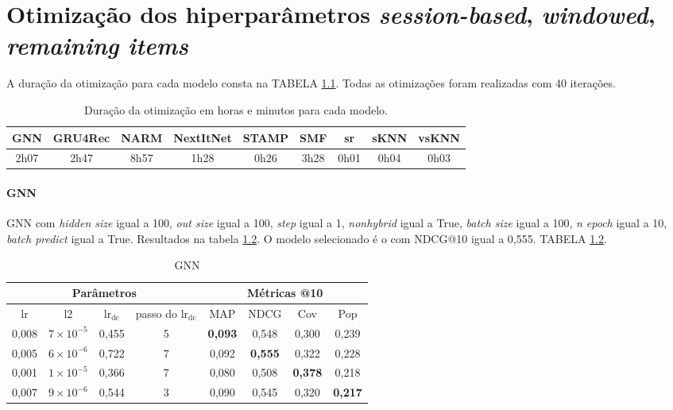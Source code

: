 \chapter{Otimização dos hiperparâmetros \textit{session-based}, \textit{windowed}, \textit{remaining items}}
A duração da otimização para cada modelo consta na TABELA
\ref{tab:duration_opt_remaining}. Todas as otimizações foram realizadas com
40 iterações.

\begin{table}[htbp]
  \centering
  \begin{tabular}{|c|c|c|c|c|c|c|c|c|}
      \hline
      GNN & GRU4Rec & NARM & NextItNet & STAMP & SMF & sr & sKNN & vsKNN \\
      \hline
      2h07 & 2h47 & 8h57 & 1h28 & 0h26 & 3h28 & 0h01 & 0h04 & 0h03 \\
      \hline
      \end{tabular}
      \caption{Duração da otimização em horas e minutos para cada modelo.}
      \label{tab:duration_opt_remaining}
\end{table}

\subsubsection{GNN}
GNN com \textit{hidden size} igual a 100, \textit{out size} igual a 100,
\textit{step} igual a 1, \textit{nonhybrid} igual a True, \textit{batch size}
igual a 100, \textit{n epoch} igual a 10, \textit{batch predict} igual a True.
Resultados na tabela \ref{opt:GNN_rem}. O modelo selecionado é o com NDCG@10
igual a 0,555. TABELA \ref{opt:GNN_rem}.

\begin{table}[htbp]
  \centering
  \begin{tabular}{|c|c|c|c|c|c|c|c|}
    \hline
      \multicolumn{4}{|c|}{Parâmetros} & \multicolumn{4}{c|}{Métricas @10} \\
      \hline
      lr & l2 & $\text{lr}_\text{dc}$ &passo do $\text{lr}_\text{dc}$ & MAP & NDCG & Cov & Pop \\
      \hline
      0,008 & $7 \times 10^{-5}$ & 0,455 & 5 & \textbf{0,093} & 0,548 & 0,300 & 0,239 \\
      \hline
      0,005 & $6 \times 10^{-6}$ & 0,722 & 7 & 0,092 & \textbf{0,555} & 0,322 & 0,228 \\
      \hline
      0,001 & $1 \times 10^{-5}$ & 0,366 & 7 & 0,080 & 0,508 & \textbf{0,378} & 0,218 \\
      \hline
      0,007 & $9 \times 10^{-6}$ & 0,544 & 3 & 0,090 & 0,545 & 0,320 & \textbf{0,217} \\
      \hline
\end{tabular}
      \caption{GNN}
      \label{opt:GNN_rem}
\end{table}

